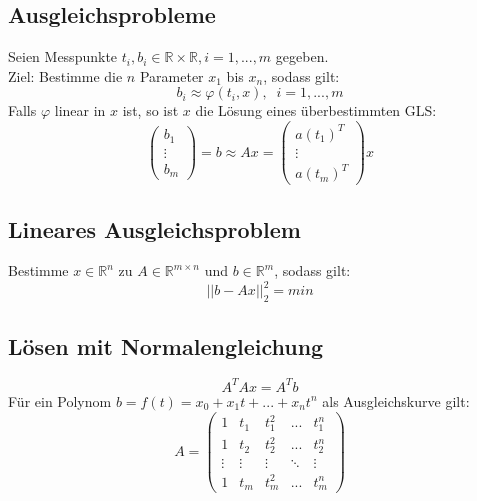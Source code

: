 \documentclass[4pt,a4paper]{scrartcl}
\begin{document}
\begin{multicols}{4}
\section{Ausgleichsprobleme}
Seien Messpunkte $t_i,b_i\in\mathbb{R}\times\mathbb{R},i=1,...,m$ gegeben.\\
Ziel: Bestimme die $n$ Parameter $x_1$ bis $x_n$, sodass gilt:
\begin{equation*}
b_i\approx\varphi(t_i,x),\;\;i=1,...,m
\end{equation*}
Falls $\varphi$ linear in $x$ ist, so ist $x$ die Lösung eines überbestimmten GLS:
\begin{equation*}
\begin{pmatrix}b_1 \\ \vdots \\ b_m\end{pmatrix}=b\approx Ax=\begin{pmatrix}a(t_1)^T \\ \vdots \\ a(t_m)^T\end{pmatrix}x
\end{equation*}

\subsection{Lineares Ausgleichsproblem}
Bestimme $x\in\mathbb{R}^n$ zu $A\in\mathbb{R}^{m\times n}$ und $b\in\mathbb{R}^m$, sodass gilt:
\begin{equation*}
||b-Ax||_2^2=min
\end{equation*}

\subsection{Lösen mit Normalengleichung}
\begin{equation*}
A^TAx=A^Tb
\end{equation*}
Für ein Polynom $b=f(t)=x_0+x_1t+...+x_nt^n$ als Ausgleichskurve gilt:
\begin{equation*}
A=\begin{pmatrix}1 & t_1 & t_1^2 & ... & t_1^n \\ 1 & t_2 & t_2^2 & ... & t_2^n \\ \vdots & \vdots & \vdots & \ddots & \vdots \\ 1 & t_m & t_m^2 & ... & t_m^n\end{pmatrix}
\end{equation*}


\end{multicols}
\end{document}
